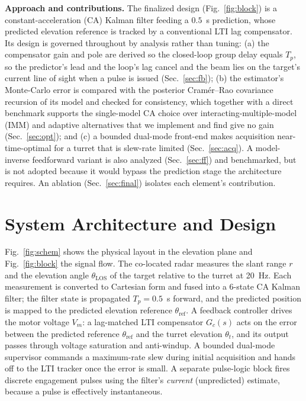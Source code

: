 \documentclass[conference]{IEEEtran}
\begin{document}
\textbf{Approach and contributions.} The finalized design (Fig.~\ref{fig:block}) is a constant-acceleration (CA) Kalman filter feeding a $0.5$~s prediction, whose predicted elevation reference is tracked by a conventional LTI lag compensator. Its design is governed throughout by analysis rather than tuning: (a) the compensator gain and pole are derived so the closed-loop group delay equals $T_p$, so the predictor's lead and the loop's lag cancel and the beam lies on the target's current line of sight when a pulse is issued (Sec.~\ref{sec:fb}); (b) the estimator's Monte-Carlo error is compared with the posterior Cram\'er--Rao covariance recursion of its model and checked for consistency, which together with a direct benchmark supports the single-model CA choice over interacting-multiple-model (IMM) and adaptive alternatives that we implement and find give no gain (Sec.~\ref{sec:opt}); and (c) a bounded dual-mode front-end makes acquisition near-time-optimal for a turret that is slew-rate limited (Sec.~\ref{sec:acq}). A model-inverse feedforward variant is also analyzed (Sec.~\ref{sec:ff}) and benchmarked, but is not adopted because it would bypass the prediction stage the architecture requires. An ablation (Sec.~\ref{sec:final}) isolates each element's contribution.

\section{System Architecture and Design}\label{sec:arch}
Fig.~\ref{fig:schem} shows the physical layout in the elevation plane and Fig.~\ref{fig:block} the signal flow. The co-located radar measures the slant range $r$ and the elevation angle $\theta_{\mathrm{LOS}}$ of the target relative to the turret at 20~Hz. Each measurement is converted to Cartesian form and fused into a 6-state CA Kalman filter; the filter state is propagated $T_p=0.5$~s forward, and the predicted position is mapped to the predicted elevation reference $\theta_{\mathrm{ref}}$. A feedback controller drives the motor voltage $V_m$: a lag-matched LTI compensator $G_c(s)$ acts on the error between the predicted reference $\theta_{\mathrm{ref}}$ and the turret elevation $\theta_t$, and its output passes through voltage saturation and anti-windup. A bounded dual-mode supervisor commands a maximum-rate slew during initial acquisition and hands off to the LTI tracker once the error is small. A separate pulse-logic block fires discrete engagement pulses using the filter's \emph{current} (unpredicted) estimate, because a pulse is effectively instantaneous.
\end{document}
